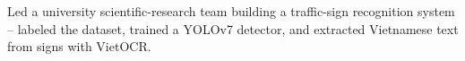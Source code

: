 
\vspace{3pt}
\begin{resume_list}
  \item Led a university scientific-research team building a traffic-sign recognition system -- labeled the dataset, trained a YOLOv7 detector, and extracted Vietnamese text from signs with VietOCR.
\end{resume_list}
